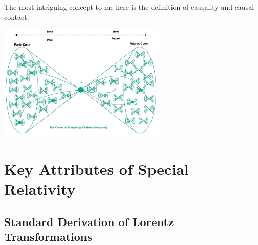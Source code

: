 \documentclass[9pt,oneside,headheight=10mm]{book}
\begin{document}
	The most intriguing concept to me here is the definition of causality and causal contact.
	\begin{center}
	\includegraphics[width=8cm]{Chap1/1-4}
	\end{center}

	\chapter{Key Attributes of Special Relativity}
	
	\section{Standard Derivation of Lorentz Transformations}
	
	\section{}
	
	
\end{document}
